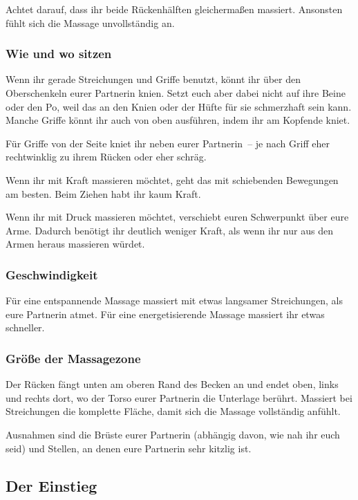 Achtet darauf, dass ihr beide Rückenhälften gleichermaßen massiert. Ansonsten fühlt sich die Massage unvollständig an.

\subsubsection{Wie und wo sitzen}

Wenn ihr gerade Streichungen und Griffe benutzt, könnt ihr über den Oberschenkeln eurer Partnerin knien. Setzt euch aber dabei nicht auf ihre Beine oder den Po, weil das an den Knien oder der Hüfte für sie schmerzhaft sein kann. Manche Griffe könnt ihr auch von oben ausführen, indem ihr am Kopfende kniet.

Für Griffe von der Seite kniet ihr neben eurer Partnerin~-- je nach Griff eher rechtwinklig zu ihrem Rücken oder eher schräg.

Wenn ihr mit Kraft massieren möchtet, geht das mit schiebenden Bewegungen am besten. Beim Ziehen habt ihr kaum Kraft.

Wenn ihr mit Druck massieren möchtet, verschiebt euren Schwerpunkt über eure Arme. Dadurch benötigt ihr deutlich weniger Kraft, als wenn ihr nur aus den Armen heraus massieren würdet.


\subsubsection{Geschwindigkeit}
Für eine entspannende Massage massiert mit etwas langsamer Streichungen, als eure Partnerin atmet. Für eine energetisierende Massage massiert ihr etwas schneller.


\subsubsection{Größe der Massagezone}

Der Rücken fängt unten am oberen Rand des Becken an und endet oben, links und rechts dort, wo der Torso eurer Partnerin die Unterlage berührt. Massiert bei Streichungen die komplette Fläche, damit sich die Massage vollständig anfühlt.

Ausnahmen sind die Brüste eurer Partnerin (abhängig davon, wie nah ihr euch seid) und Stellen, an denen eure Partnerin sehr kitzlig ist.

\newpage
\subsection{Der Einstieg}

